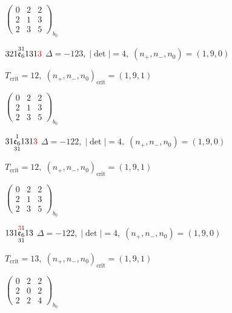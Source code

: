 \documentclass[10pt]{article}
\begin{document}
\hspace{2em}$\left(\begin{smallmatrix}0 & 2 & 2 \\ 2 & 1 & 3 \\ 2 & 3 & 5\end{smallmatrix}\right)_{\!b_0}$

\smallskip

$321\overset{31}{\mathfrak{e}_6}131\textcolor{red}{3}$ \quad $\Delta=-123,\; |\det|=4,\; (n_+,n_-,n_0)=(1,9,0)$

\hspace{1em}$T_{\text{crit}}=12,\; (n_+,n_-,n_0)_{\text{crit}}=(1,9,1)$

\hspace{2em}$\left(\begin{smallmatrix}0 & 2 & 2 \\ 2 & 1 & 3 \\ 2 & 3 & 5\end{smallmatrix}\right)_{\!b_0}$

\smallskip

$31\overset{1}{\underset{31}{\mathfrak{e}_6}}131\textcolor{red}{3}$ \quad $\Delta=-122,\; |\det|=4,\; (n_+,n_-,n_0)=(1,9,0)$

\hspace{1em}$T_{\text{crit}}=12,\; (n_+,n_-,n_0)_{\text{crit}}=(1,9,1)$

\hspace{2em}$\left(\begin{smallmatrix}0 & 2 & 2 \\ 2 & 1 & 3 \\ 2 & 3 & 5\end{smallmatrix}\right)_{\!b_0}$

$131\overset{\textcolor{red}{3}1}{\underset{31}{\mathfrak{e}_6}}13$ \quad $\Delta=-122,\; |\det|=4,\; (n_+,n_-,n_0)=(1,9,0)$

\hspace{1em}$T_{\text{crit}}=13,\; (n_+,n_-,n_0)_{\text{crit}}=(1,9,1)$

\hspace{2em}$\left(\begin{smallmatrix}0 & 2 & 2 \\ 2 & 0 & 2 \\ 2 & 2 & 4\end{smallmatrix}\right)_{\!b_0}$

\smallskip
\end{document}

